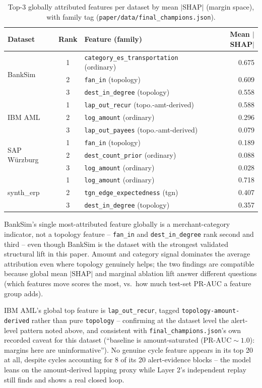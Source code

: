 \begin{table}[t]
\centering
\caption{Top-3 globally attributed features per dataset by mean $|$SHAP$|$ (margin space), with family tag (\texttt{paper/data/final\_champions.json}).}
\label{tab:global_shap}
\small
\begin{tabular}{lclr}
\toprule
Dataset & Rank & Feature (family) & Mean $|$SHAP$|$ \\
\midrule
\multirow{3}{*}{BankSim}
 & 1 & \texttt{category\_es\_transportation} (ordinary) & 0.675 \\
 & 2 & \texttt{fan\_in} (topology) & 0.609 \\
 & 3 & \texttt{dest\_in\_degree} (topology) & 0.558 \\
\midrule
\multirow{3}{*}{IBM AML}
 & 1 & \texttt{lap\_out\_recur} (topo.-amt-derived) & 0.588 \\
 & 2 & \texttt{log\_amount} (ordinary) & 0.296 \\
 & 3 & \texttt{lap\_out\_payees} (topo.-amt-derived) & 0.079 \\
\midrule
\multirow{3}{*}{SAP Würzburg}
 & 1 & \texttt{fan\_in} (topology) & 0.189 \\
 & 2 & \texttt{dest\_count\_prior} (ordinary) & 0.088 \\
 & 3 & \texttt{log\_amount} (ordinary) & 0.028 \\
\midrule
\multirow{3}{*}{synth\_erp}
 & 1 & \texttt{log\_amount} (ordinary) & 0.718 \\
 & 2 & \texttt{tgn\_edge\_expectedness} (tgn) & 0.407 \\
 & 3 & \texttt{dest\_in\_degree} (topology) & 0.357 \\
\bottomrule
\end{tabular}
\end{table}

BankSim's single most-attributed feature globally is a merchant-category
indicator, not a topology feature -- \texttt{fan\_in} and
\texttt{dest\_in\_degree} rank second and third -- even though BankSim is
the dataset with the strongest validated structural lift in this paper.
Amount and category signal dominates the average attribution even where
topology genuinely helps; the two findings are compatible because global
mean $|\text{SHAP}|$ and marginal ablation lift answer different questions
(which features move scores the most, vs.\ how much test-set PR-AUC a
feature group adds).

IBM AML's global top feature is \texttt{lap\_out\_recur}, tagged
\texttt{topology-amount-derived} rather than pure \texttt{topology} --
confirming at the dataset level the alert-level pattern noted above, and
consistent with \texttt{final\_champions.json}'s own recorded caveat for
this dataset (``baseline is amount-saturated ($\mathrm{PR\text{-}
AUC}\sim1.0$): margins here are uninformative''). No genuine cycle feature
appears in its top 20 at all, despite cycles accounting for 8 of its 20
alert-evidence blocks -- the model leans on the amount-derived lapping
proxy while Layer 2's independent replay still finds and shows a real
closed loop.

